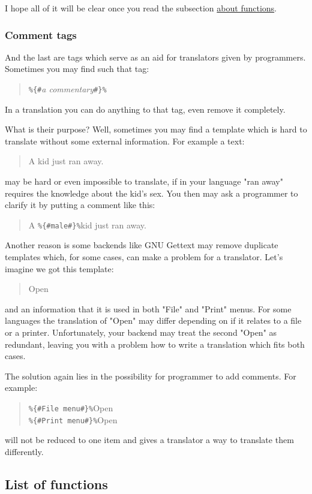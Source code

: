 I hope all of it will be clear once you read the subsection \hyperref[funcs]{about functions}.

\subsubsection{Comment tags}

And the last are tags which serve as an aid for translators given by programmers. Sometimes you may find such that tag:
\begin{quote}
	\verb+%{#+\textit{a commentary}\verb+#}%+
\end{quote}
In a translation you can do anything to that tag, even remove it completely. 

What is their purpose? Well, sometimes you may find a template which is hard to translate without some external information. For example a text: \begin{quote}
	A kid just ran away.
\end{quote} may be hard or even impossible to translate, if in your language "ran away" requires the knowledge about the kid's sex. You then may ask a programmer to clarify it by putting a comment like this:
\begin{quote}
	A \verb+%{#male#}%+kid just ran away.
\end{quote}

Another reason is some backends like GNU Gettext may remove duplicate templates which, for some cases, can make a problem for a translator. Let's imagine we got this template:
\begin{quote}
	Open
\end{quote}
and an information that it is used in both "File" and "Print" menus. For some languages the translation of "Open" may differ depending on if it relates to a file or a printer.
Unfortunately, your backend may treat the second "Open" as redundant, leaving you with a problem how to write a translation which fits both cases.

The solution again lies in the possibility for programmer to add comments. For example:
\begin{quote}
	\verb+%{#File menu#}%+Open\\
	\verb+%{#Print menu#}%+Open
\end{quote} will not be reduced to one item and gives a translator a way to translate them differently. 

\subsection{List of functions}\label{funcs}

